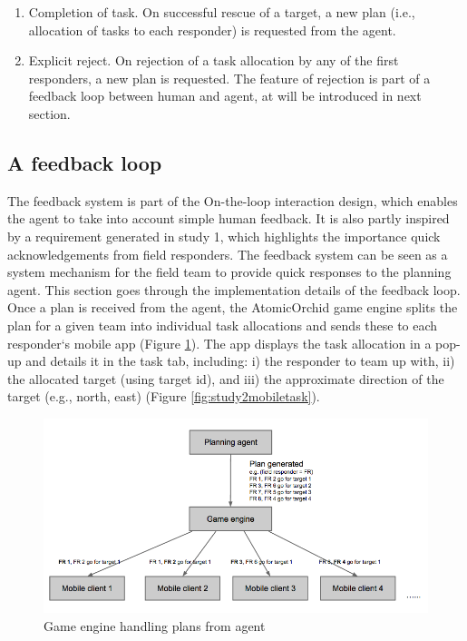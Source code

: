 \begin{enumerate}
\item Completion of task. On successful rescue of a target, a new plan (i.e., allocation of tasks to each responder) is requested from the agent.\\

\item Explicit reject. On rejection of a task allocation by any of the first responders, a new plan is requested.  The feature of rejection is part of a feedback loop between human and agent, at will be introduced in next section.\\

\end{enumerate}

\subsection{A feedback loop}\label{sec:study2feedback}
The feedback system is part of the On-the-loop interaction design, which enables the agent to take into account simple human feedback. It is also partly inspired by a requirement generated in study 1, which highlights the importance quick acknowledgements from field responders. The feedback system can be seen as a system mechanism for the field team to provide quick responses to the planning agent. This section goes through the implementation details of the feedback loop.\\

Once a plan is received from the agent, the AtomicOrchid game engine splits the plan for a given team into individual task allocations and sends these to each responder`s mobile app (Figure \ref{fig:handlingplans}). The app displays the task allocation in a pop-up and details it in the task tab, including: i) the responder to team up with, ii) the allocated target (using target id), and iii) the approximate direction of the target (e.g., north, east) (Figure \ref{fig:study2mobiletask}).\\

\begin{figure}[h]
  \centering
  \includegraphics[width=1\textwidth]{img/study2/system/dealingwithplans}
  \caption{Game engine handling plans from agent}
  \label{fig:handlingplans}
\end{figure}

